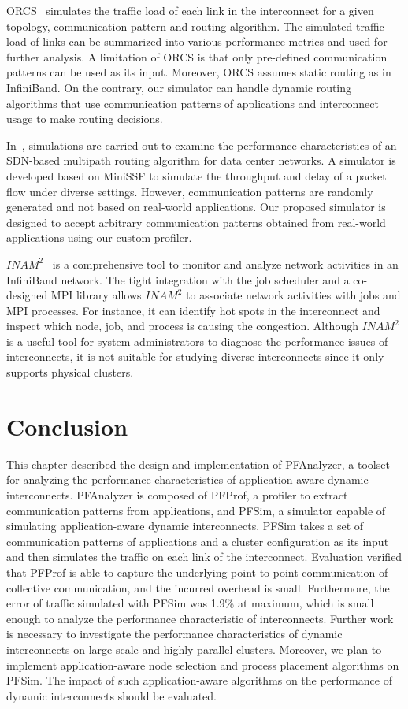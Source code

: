 ORCS~\autocite{Schneider2009} simulates the traffic load of each link in
the interconnect for a given topology, communication pattern and routing
algorithm. The simulated traffic load of links can be summarized into
various performance metrics and used for further analysis. A limitation
of ORCS is that only pre-defined communication patterns can be used as
its input. Moreover, ORCS assumes static routing as in InfiniBand. On
the contrary, our simulator can handle dynamic routing algorithms that
use communication patterns of applications and interconnect usage to
make routing decisions.

In~\autocite{Jo2015}, simulations are carried out to examine the
performance characteristics of an SDN-based multipath routing algorithm
for data center networks. A simulator is developed based on MiniSSF to
simulate the throughput and delay of a packet flow under diverse
settings. However, communication patterns are randomly generated and not
based on real-world applications. Our proposed simulator is designed to
accept arbitrary communication patterns obtained from real-world
applications using our custom profiler.

\(\mathit{INAM}^2\)~\autocite{Subramoni2016} is a comprehensive tool to
monitor and analyze network activities in an InfiniBand network. The
tight integration with the job scheduler and a co-designed MPI library
allows \(\mathit{INAM}^2\) to associate network activities with jobs and
MPI processes. For instance, it can identify hot spots in the
interconnect and inspect which node, job, and process is causing the
congestion. Although \(\mathit{INAM}^2\) is a useful tool for system
administrators to diagnose the performance issues of interconnects, it
is not suitable for studying diverse interconnects since it only
supports physical clusters.

\section{Conclusion}\label{sec:ii-conclusion}

This chapter described the design and implementation of PFAnalyzer, a
toolset for analyzing the performance characteristics of
application-aware dynamic interconnects. PFAnalyzer is composed of
PFProf, a profiler to extract communication patterns from applications,
and PFSim, a simulator capable of simulating application-aware dynamic
interconnects. PFSim takes a set of communication patterns of
applications and a cluster configuration as its input and then simulates
the traffic on each link of the interconnect. Evaluation verified that PFProf
is able to capture the underlying point-to-point communication of collective
communication, and the incurred overhead is small. Furthermore, the error
of traffic simulated with PFSim was 1.9\% at maximum, which is small enough to
analyze the performance characteristic of interconnects.
Further work is necessary to investigate the performance characteristics
of dynamic interconnects on large-scale and highly parallel clusters.
Moreover, we plan to implement application-aware node selection and
process placement algorithms on PFSim. The impact of such
application-aware algorithms on the performance of dynamic interconnects
should be evaluated.
